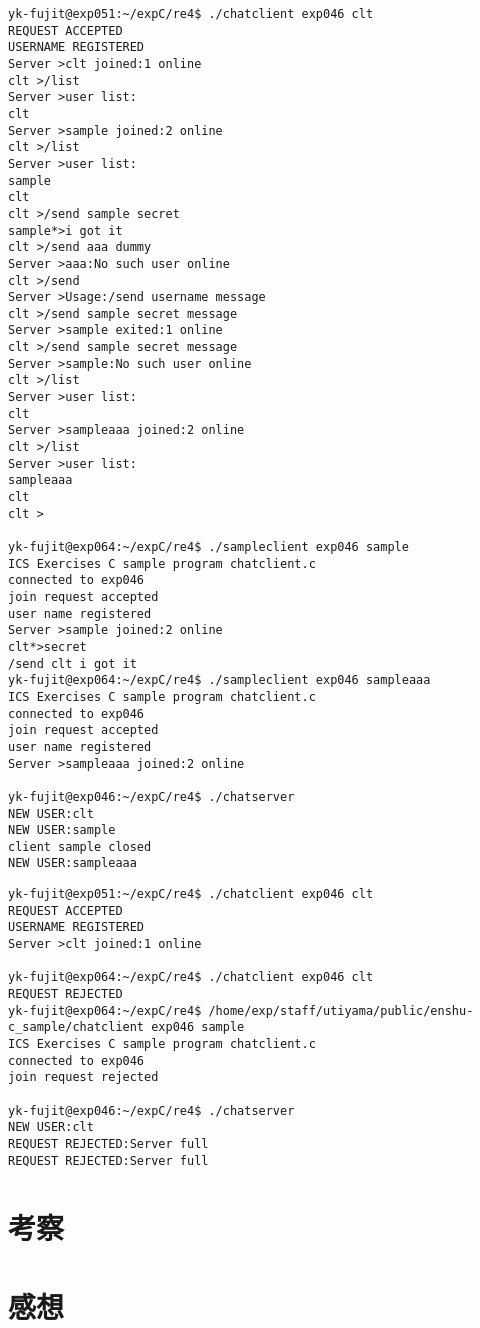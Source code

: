 \documentclass[a4j,10pt,titlepage]{jsarticle}
\begin{document}
\begin{verbatim}
yk-fujit@exp051:~/expC/re4$ ./chatclient exp046 clt
REQUEST ACCEPTED
USERNAME REGISTERED
Server >clt joined:1 online
clt >/list
Server >user list:
clt
Server >sample joined:2 online
clt >/list
Server >user list:
sample
clt
clt >/send sample secret
sample*>i got it
clt >/send aaa dummy
Server >aaa:No such user online
clt >/send
Server >Usage:/send username message
clt >/send sample secret message
Server >sample exited:1 online
clt >/send sample secret message
Server >sample:No such user online
clt >/list
Server >user list:
clt
Server >sampleaaa joined:2 online
clt >/list
Server >user list:
sampleaaa
clt
clt >

yk-fujit@exp064:~/expC/re4$ ./sampleclient exp046 sample
ICS Exercises C sample program chatclient.c
connected to exp046
join request accepted
user name registered
Server >sample joined:2 online
clt*>secret
/send clt i got it
yk-fujit@exp064:~/expC/re4$ ./sampleclient exp046 sampleaaa
ICS Exercises C sample program chatclient.c
connected to exp046
join request accepted
user name registered
Server >sampleaaa joined:2 online

yk-fujit@exp046:~/expC/re4$ ./chatserver 
NEW USER:clt
NEW USER:sample
client sample closed
NEW USER:sampleaaa
\end{verbatim}

\begin{verbatim}
yk-fujit@exp051:~/expC/re4$ ./chatclient exp046 clt
REQUEST ACCEPTED
USERNAME REGISTERED
Server >clt joined:1 online

yk-fujit@exp064:~/expC/re4$ ./chatclient exp046 clt
REQUEST REJECTED
yk-fujit@exp064:~/expC/re4$ /home/exp/staff/utiyama/public/enshu-c_sample/chatclient exp046 sample
ICS Exercises C sample program chatclient.c
connected to exp046
join request rejected

yk-fujit@exp046:~/expC/re4$ ./chatserver 
NEW USER:clt
REQUEST REJECTED:Server full
REQUEST REJECTED:Server full
\end{verbatim}

\section{考察}

\section{感想}
\end{document}
